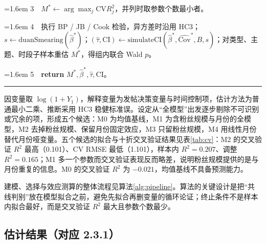 \begin{center}
\begin{minipage}{\textwidth}
{\par
\hangindent=1.6em \hspace*{1.2em}3\ \ $M^{*}\leftarrow\arg\max_{j}\mathrm{CV}R^2_j$，并列时取参数个数最小者。\par\vspace{3pt}
\par
\hangindent=1.6em \hspace*{1.2em}4\ \ 执行 BP / JB / Cook 检验，异方差时沿用 HC3；$s\leftarrow\mathrm{duanSmearing}(\hat\beta^{*})$；$(\hat\tau,\text{CI})\leftarrow\mathrm{simulateCI}(\hat\beta^{*},\widehat{\mathrm{Cov}}^{*},B,s)$；对类型、主题、时段子样本重估 $M^{*}$，得组内联合 Wald $p$。\par\vspace{3pt}
\hangindent=1.6em \hspace*{1.2em}5\ \ \textbf{return} $M^{*},\hat\beta^{*},\hat\tau,\text{CI}$。\par}
\vspace{2pt}\noindent\rule{\textwidth}{0.9pt}\par\vspace{6pt}
\end{minipage}
\end{center}

因变量取 $\log(1+Y_1)$，解释变量为发帖决策变量与时间控制项，估计方法为普通最小二乘、推断采用 HC3 稳健标准误。设定从“全模型”出发逐步剔除不可识别或冗余的项，形成五个候选：M0 为均值基线，M1 为含粉丝规模与月份的全模型，M2 去掉粉丝规模、保留月份固定效应，M3 只留粉丝规模，M4 用线性月份替代月份哑变量。五个候选的拟合与十折交叉验证结果见表\ref{tab:cv}：M2 的交叉验证 $R^2$ 最高（0.101）、CV RMSE 最低（1.101），样本内 $R^2=0.207$、调整 $R^2=0.165$；M1 多一个参数而交叉验证表现反而略差，说明粉丝规模提供的是与月份重复的信息。M0 的交叉验证 $R^2$ 为 $-0.021$，均值基线不具备预测能力。




建模、选择与效应测算的整体流程见算法\ref{alg:pipeline}。算法的关键设计是把“共线判别”放在模型拟合之前，避免先拟合再删变量的循环论证；终止条件不是样本内拟合最好，而是交叉验证 $R^2$ 最大且参数个数最少。



\subsection{估计结果（对应 2.3.1）}

